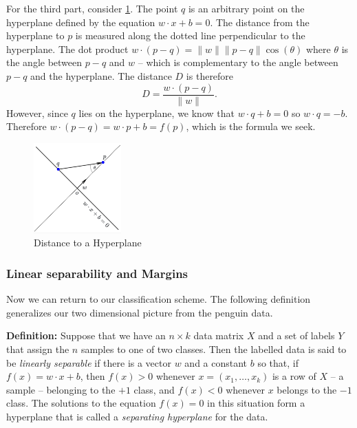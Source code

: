 \documentclass[
]{article}
\begin{document}
For the third part, consider \cref{fig:triangle}. The point \(q\) is an
arbitrary point on the hyperplane defined by the equation
\(w\cdot x+b=0\). The distance from the hyperplane to \(p\) is measured
along the dotted line perpendicular to the hyperplane. The dot product
\(w\cdot (p-q) = \|w\|\|p-q\|\cos(\theta)\) where \(\theta\) is the
angle between \(p-q\) and \(w\) -- which is complementary to the angle
between \(p-q\) and the hyperplane. The distance \(D\) is therefore \[
D=\frac{w\cdot(p-q)}{\|w\|}.
\] However, since \(q\) lies on the hyperplane, we know that
\(w\cdot q+b=0\) so \(w\cdot q = -b\). Therefore
\(w\cdot(p-q)=w\cdot p+b=f(p)\), which is the formula we seek.

\begin{figure}
\hypertarget{fig:triangle}{%
\centering
\includegraphics[width=0.3\textwidth,height=\textheight]{../img/triangle.png}
\caption{Distance to a Hyperplane}\label{fig:triangle}
}
\end{figure}

\hypertarget{sec:linearseparable}{%
\subsubsection{Linear separability and
Margins}\label{sec:linearseparable}}

Now we can return to our classification scheme. The following definition
generalizes our two dimensional picture from the penguin data.

\textbf{Definition:} Suppose that we have an \(n\times k\) data matrix
\(X\) and a set of labels \(Y\) that assign the \(n\) samples to one of
two classes. Then the labelled data is said to be \emph{linearly
separable} if there is a vector \(w\) and a constant \(b\) so that, if
\(f(x)=w\cdot x+b\), then \(f(x)>0\) whenever \(x=(x_1,\ldots, x_k)\) is
a row of \(X\) -- a sample -- belonging to the \(+1\) class, and
\(f(x)<0\) whenever \(x\) belongs to the \(-1\) class. The solutions to
the equation \(f(x)=0\) in this situation form a hyperplane that is
called a \emph{separating hyperplane} for the data.
\end{document}
